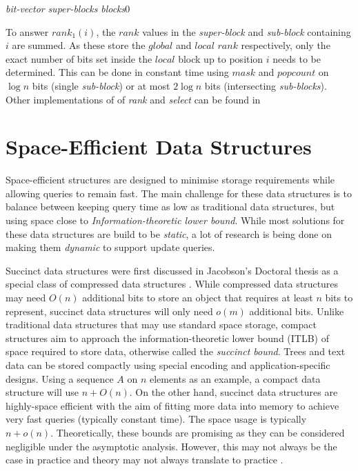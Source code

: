 \textit{bit-vector}\quad\quad{}\newline
\textit{super-blocks}\quad{}\quad\quad\quad\quad\quad\quad\quad\quad\quad\quad \quad \quad \quad \quad \quad \quad {}\newline
\textit{blocks}\hspace{1.79cm}0\quad\quad{}\quad\quad{}\quad\quad{}\quad\quad{}\quad\quad{}\quad\quad{}
\par
To answer $rank_1(i)$, the $rank$ values in the \textit{super-block} and \textit{sub-block} containing $i$ are summed. As these store the $global$ and $local$ $rank$ respectively, only the exact number of bits set inside the $local$ block up to position $i$ needs to be determined. This can be done in constant time using $mask$ and $popcount$ on $\log n$ bits (single \textit{sub-block}) or at most $2\log n$ bits (intersecting \textit{sub-blocks}). Other implementations of of \textit{rank} and \textit{select} can be found in \cite{Arroyuelo_2016,Delpratt_2009, DBLP:journals/corr/PatrascuT14,  Pibiri_2017, Prezza17}
\section{Space-Efficient Data Structures}
Space-efficient structures are designed to minimise storage requirements while allowing queries to remain fast. The main challenge for these data structures is to balance between keeping query time as low as traditional data structures, but using space close to \textit{Information-theoretic lower bound}. While most solutions for these data structures are build to be \textit{static}, a lot of research is being done on making them \textit{dynamic} to support update queries.\par

Succinct data structures were first discussed in Jacobson's Doctoral thesis  as a special class of compressed data structures \cite{Jacobson_1989}. While compressed data structures may need $O(n)$ additional bits to store an object that requires at least $n$ bits to represent, succinct data structures will only need $o(m)$ additional bits. Unlike traditional data structures that may use standard space storage, compact structures aim to approach the information-theoretic lower bound (ITLB) of space required to store data, otherwise called the \textit{succinct bound}. Trees and text data can be stored compactly using special encoding and application-specific designs. Using a sequence $A$ on $n$ elements as an example, a compact data structure will use $n + O(n)$. On the other hand, succinct data structures are highly-space efficient with the aim of fitting more data into memory to achieve very fast queries (typically constant time). The space usage is typically $n + o(n)$. Theoretically, these bounds are promising as they can be considered negligible under the asymptotic analysis. However, this may not always be the case in practice and theory may not always translate to practice \cite{Gonzalez_2005, Gog_2013}.

